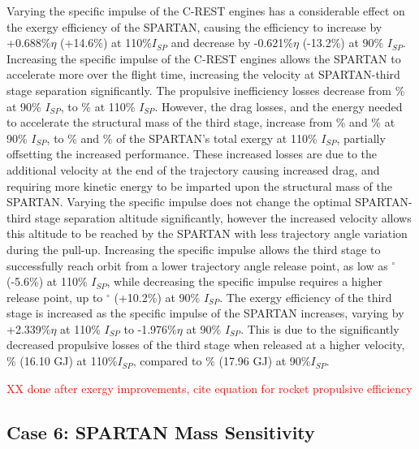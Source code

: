 Varying the specific impulse of the C-REST engines has a considerable effect on the exergy efficiency of the SPARTAN, causing the efficiency to increase by +0.688\%$\eta$ (+14.6\%) at 110\%$I_{SP}$ and decrease by -0.621\%$\eta$ (-13.2\%) at 90\% $I_{SP}$. 
Increasing the specific impulse of the C-REST engines allows the SPARTAN to accelerate more over the flight time, increasing the velocity at SPARTAN-third stage separation significantly. The propulsive inefficiency losses decrease from \PlosssecondCombinedIspNinetyNoReturn\% at 90\% $I_{SP}$, to \PlosssecondCombinedIspOneHundredTenNoReturn \% at 110\% $I_{SP}$. However, the drag losses, and the energy needed to accelerate the structural mass of the third stage, increase from \WDsecondIspNinetyNoReturn\% and \WsecondIspNinetyNoReturn\% at 90\% $I_{SP}$, to \WDsecondIspOneHundredTenNoReturn\% and \WsecondIspOneHundredTenNoReturn\% of the SPARTAN's total exergy at 110\% $I_{SP}$, partially offsetting the increased performance. These increased losses are due to the additional velocity at the end of the trajectory causing increased drag, and requiring more kinetic energy to be imparted upon the structural mass of the SPARTAN. 
 Varying the specific impulse does not change the optimal SPARTAN-third stage separation altitude significantly, however the increased velocity allows this altitude to be reached by the SPARTAN with less trajectory angle variation during the pull-up. Increasing the specific impulse allows the third stage to successfully reach orbit from a lower trajectory angle release point, as low as \secondthirdSeparationgammaIspOneHundredTenNoReturn$^\circ$ (-5.6\%) at 110\% $I_{SP}$, while decreasing the specific impulse requires a higher release point, up to \secondthirdSeparationgammaIspNinetyNoReturn$^\circ$ (+10.2\%) at 90\% $I_{SP}$.
The exergy efficiency of the third stage is increased as the specific impulse of the SPARTAN increases, varying by +2.339\%$\eta$ at 110\% $I_{SP}$ to -1.976\%$\eta$ at 90\% $I_{SP}$. This is due to the significantly decreased propulsive losses of the third stage when released at a higher velocity, \PlossthreeCombinedIspOneHundredTenNoReturn\% (16.10 GJ) at 110\%$I_{SP}$, compared to \PlossthreeCombinedIspNinetyNoReturn\% (17.96 GJ) at 90\%$I_{SP}$. 

\textcolor{red}{XX done after exergy improvements, cite equation for rocket propulsive efficiency}

\subsection{Case 6: SPARTAN Mass Sensitivity}\label{sec:SpartanMassnoreturn}


